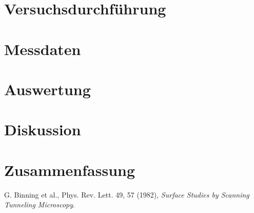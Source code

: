 \documentclass[10pt, a4paper]{article}
\begin{document}
\section{Versuchsdurchführung}

\section{Messdaten}

\section{Auswertung}

\section{Diskussion}

\section{Zusammenfassung}


\begin{thebibliography}{9}

  G. Binning et al., Phys. Rev. Lett. 49, 57 (1982),
  \emph{Surface Studies by Scanning Tunneling Microscopy}.
\end{thebibliography}
\end{document}
